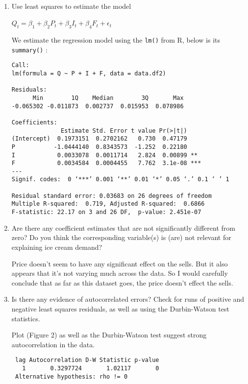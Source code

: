 \documentclass[12pt]{article}
\begin{document}
\begin{enumerate}
\begin{enumerate}
\item Use least squares to estimate the model
\\ \\
$Q_t = \beta_1 + \beta_2 P_t + \beta_3 I_t + \beta_4 F_t + \epsilon_t$
\\

\begin{Answer}

We estimate the regression model using the \verb|lm()| from R, below is its \verb|summary()| :

\begin{verbatim}
Call:
lm(formula = Q ~ P + I + F, data = data.df2)

Residuals:
      Min        1Q    Median        3Q       Max 
-0.065302 -0.011873  0.002737  0.015953  0.078986 

Coefficients:
              Estimate Std. Error t value Pr(>|t|)    
(Intercept)  0.1973151  0.2702162   0.730  0.47179    
P           -1.0444140  0.8343573  -1.252  0.22180    
I            0.0033078  0.0011714   2.824  0.00899 ** 
F            0.0034584  0.0004455   7.762  3.1e-08 ***
---
Signif. codes:  0 ‘***’ 0.001 ‘**’ 0.01 ‘*’ 0.05 ‘.’ 0.1 ‘ ’ 1

Residual standard error: 0.03683 on 26 degrees of freedom
Multiple R-squared:  0.719,	Adjusted R-squared:  0.6866 
F-statistic: 22.17 on 3 and 26 DF,  p-value: 2.451e-07
\end{verbatim}
\end{Answer}

\item Are there any coefficient estimates that are not significantly different from zero? Do you think the corresponding variable(s) is (are) not relevant for explaining ice cream demand?

\begin{Answer}
Price doesn't seem to have any significant effect on the sells. But it also appears that it's not varying much across the data. So I would carefully conclude that as far as this dataset goes, the price doesn't effect the sells.
\end{Answer}

\item Is there any evidence of autocorrelated errors? Check for runs of positive and negative least squares residuals, as well as using the Durbin-Watson test statistics.

\begin{Answer}
Plot (Figure 2) as well as the Durbin-Watson test suggest strong autocorrelation in the data.
\begin{verbatim}
 lag Autocorrelation D-W Statistic p-value
   1       0.3297724       1.02117       0
 Alternative hypothesis: rho != 0
\end{verbatim}
\end{Answer}

\end{enumerate}

\end{enumerate}
\end{document}
